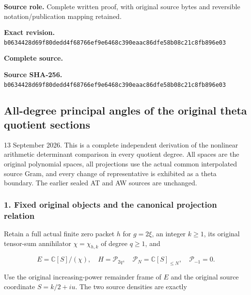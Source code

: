 \documentclass{article}
\begin{document}
\maketitle
\begingroup
\sloppy
\small

\noindent\textbf{Source role.} Complete written proof, with original source bytes and reversible notation/publication mapping retained.\par
\noindent\textbf{Exact revision.} \nolinkurl{b0634428d69f80dedd4f68766ef9e6468c390eaac86dfe58b08c21c8fb896e03}\par
\noindent\textbf{Complete source.} \par
\noindent\textbf{Source SHA-256.} \nolinkurl{b0634428d69f80dedd4f68766ef9e6468c390eaac86dfe58b08c21c8fb896e03}\par\medskip
\subsection{All-degree principal angles of the original theta quotient sections}\label{endpoint-all_degree_angle_review--all-degree-principal-angles-of-the-original-theta-quotient-sections}

13 September 2026. This is a complete independent derivation of the nonlinear arithmetic determinant comparison in every quotient degree. All spaces are the original polynomial spaces, all projections use the actual common interpolated source Gram, and every change of representative is exhibited as a theta boundary. The earlier sealed AT and AW sources are unchanged.

\subsubsection{1. Fixed original objects and the canonical projection relation}\label{endpoint-all_degree_angle_review--fixed-original-objects-and-the-canonical-projection-relation}

Retain a full actual finite zero packet \(h\) for \(g=2\xi\), an integer \(k\ge1\), its original tensor-sum annihilator \(\chi=\chi_{h,k}\) of degree \(q\ge1\), and

\[
E=\mathbb C[S]/(\chi),\quad H=\mathcal P_{2q},\quad
\mathcal P_N=\mathbb C[S]_{\le N},\quad\mathcal P_{-1}=0.
\tag{AA1}
\]

Use the original increasing-power remainder frame of \(E\) and the original source coordinate \(S=k/2+iu\). The two source densities are exactly
\end{document}
